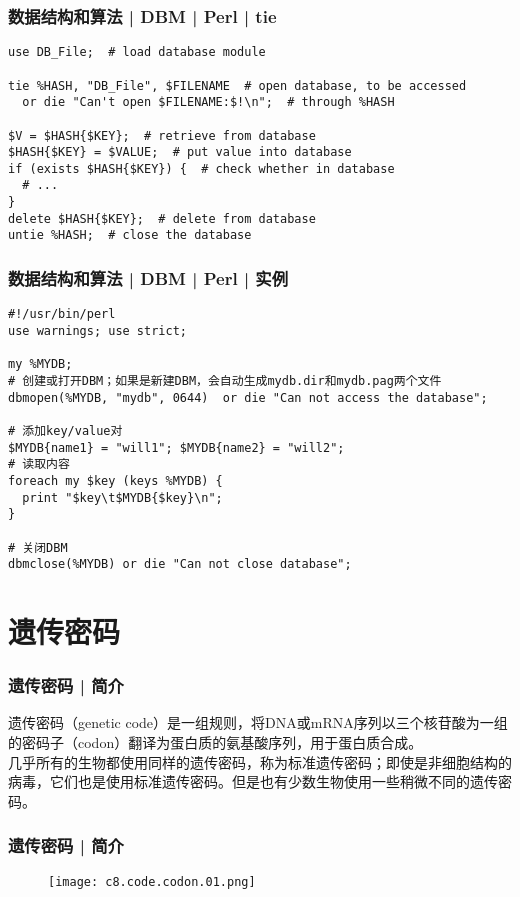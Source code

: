 \begin{frame}[fragile]
  \frametitle{数据结构和算法 | DBM | Perl | tie}
\begin{lstlisting}
use DB_File;  # load database module

tie %HASH, "DB_File", $FILENAME  # open database, to be accessed
  or die "Can't open $FILENAME:$!\n";  # through %HASH

$V = $HASH{$KEY};  # retrieve from database
$HASH{$KEY} = $VALUE;  # put value into database
if (exists $HASH{$KEY}) {  # check whether in database
  # ...
}
delete $HASH{$KEY};  # delete from database
untie %HASH;  # close the database
\end{lstlisting}
\end{frame}

\begin{frame}[fragile]
  \frametitle{数据结构和算法 | DBM | Perl | 实例}
\begin{lstlisting}[basicstyle=\small\tt]
#!/usr/bin/perl
use warnings; use strict;
 
my %MYDB;
# 创建或打开DBM；如果是新建DBM，会自动生成mydb.dir和mydb.pag两个文件
dbmopen(%MYDB, "mydb", 0644)  or die "Can not access the database";

# 添加key/value对
$MYDB{name1} = "will1"; $MYDB{name2} = "will2";
# 读取内容
foreach my $key (keys %MYDB) {
  print "$key\t$MYDB{$key}\n";
}

# 关闭DBM
dbmclose(%MYDB) or die "Can not close database";
\end{lstlisting}
\end{frame}

\section{遗传密码}
\begin{frame}
  \frametitle{遗传密码 | 简介}
  遗传密码（genetic code）是一组规则，将DNA或mRNA序列以三个核苷酸为一组的密码子（codon）翻译为蛋白质的氨基酸序列，用于蛋白质合成。\\
  \vspace{1em}
  几乎所有的生物都使用同样的遗传密码，称为标准遗传密码；即使是非细胞结构的病毒，它们也是使用标准遗传密码。但是也有少数生物使用一些稍微不同的遗传密码。
\end{frame}

\begin{frame}
  \frametitle{遗传密码 | 简介}
  \begin{figure}
    \centering
    \texttt{[image: c8.code.codon.01.png]}
  \end{figure}
\end{frame}

